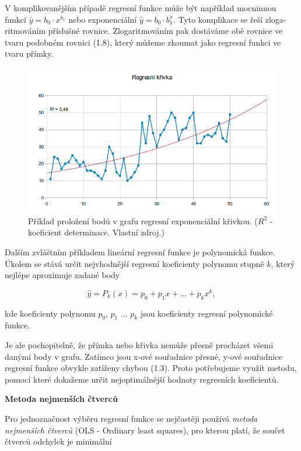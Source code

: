 \documentclass[a4paper,12pt,twoside]{scrreprt}
\begin{document}
V komplikovanějším případě regresní funkce může být například mocninnou funkcí $\hat{y} = b_0 \cdot x^{b_1}$ nebo exponenciální $\hat{y} = b_0 \cdot b_1^x$. Tyto komplikace se řeší zloga-ritmováním příslušné rovnice. Zlogaritmováním pak dostáváme obě rovnice ve tvaru podobném rovnici (1.8), který můžeme zkoumat jako regresní funkci ve tvaru přímky.

\begin{figure}[h]
  \centering
  \includegraphics[width=15cm]{pictures/krivka.png}
  \caption{Příklad proložení bodů v grafu regresní exponenciální křivkou. \newline($R^2$ - koeficient determinace. Vlastní zdroj.)}
  \label{fig:křivka}
\end{figure}

Dalším zvláštním příkladem lineární regresní funkce je polynomická funkce. Úkolem se stává určit nejvhodnější regresní koeficienty polynomu stupně $k$, který nejlépe aproximuje zadané body

\begin{equation}
\hat{y} = P_k(x) = p_0 + p_1x + ... + p_kx^k,
\end{equation} 

kde koeficienty polynomu $p_0$, $p_1$ ... $p_k$ jsou koeficienty regresní polynomické funkce. 

Je ale pochopitelně, že přímka nebo křivka nemůže přesně procházet všemi danými body v grafu. Zatímco jsou x-ové souřadnice přesné, y-ové souřadnice regresní funkce obvykle zatíženy chybou (1.3). Proto potřebujeme využít metodu, pomocí které dokažeme určit nejoptimálnější hodnoty regresních koeficientů. 

\normalsize\textbf{\newline Metoda nejmenších čtverců}

Pro jednoznačnost výběru regresní funkce se nejčastěji používá \textit{metoda nejmenších čtverců} (OLS - Ordinary least squares), pro kterou platí, že součet čtverců odchylek je minimální
\end{document}
